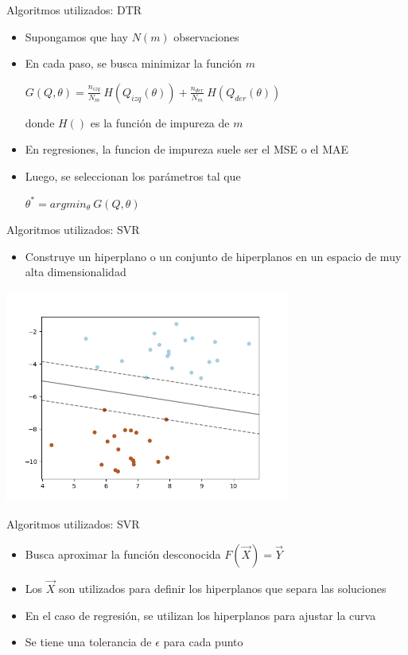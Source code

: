 \documentclass[10pt]{beamer}
\begin{document}
\begin{frame}{Algoritmos utilizados: DTR}
  \begin{itemize}
    \item Supongamos que hay $N(m)$ observaciones
    \item En cada paso, se busca minimizar la función $m$
      \begin{center}
        $G(Q, \theta) = \frac{n_{izq}}{N_{m}} \ H(Q_{izq}(\theta)) + \frac{n_{der}}{N_{m}} \ H(Q_{der}(\theta))$
      \end{center}
      donde $H()$ es la función de impureza de $m$
      \item En regresiones, la funcion de impureza suele ser el MSE o el MAE
      \item Luego, se seleccionan los parámetros tal que
      \begin{center}
        $\theta^{*} = argmin_{\theta} \ G(Q, \theta)$
      \end{center}
  \end{itemize}
\end{frame}


\begin{frame}{Algoritmos utilizados: SVR}
  \begin{itemize}
    \item Construye un hiperplano o un conjunto de hiperplanos en un espacio de muy alta dimensionalidad
  \end{itemize}
  \begin{center}
    \includegraphics[width=0.7\textwidth]{svm_hiperplane}
  \end{center}
\end{frame}


\begin{frame}{Algoritmos utilizados: SVR}
  \begin{itemize}
    \item Busca aproximar la función desconocida $F(\vec{X}) = \vec{Y}$
    \item Los $\vec{X}$ son utilizados para definir los hiperplanos que separa las soluciones
    \item En el caso de regresión, se utilizan los hiperplanos para ajustar la curva
    \item Se tiene una tolerancia de $\epsilon$ para cada punto
  \end{itemize}
\end{frame}
\end{document}
